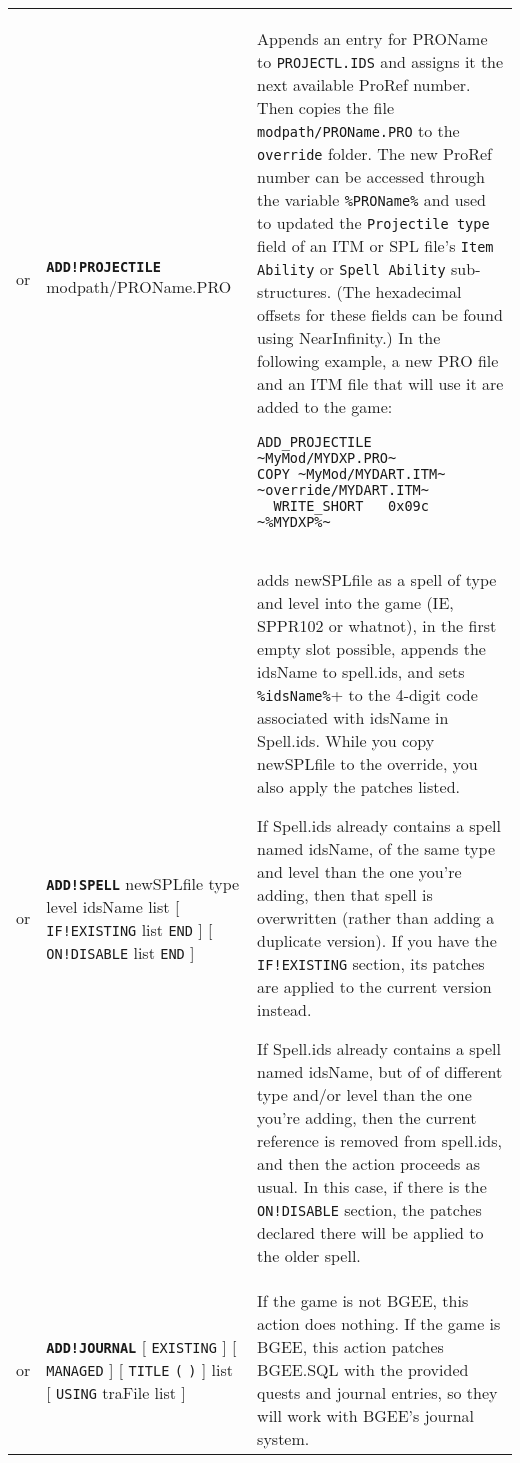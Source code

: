 \documentclass{article}
\def\ttref#1{\ahrefloc{#1}{\tt #1}}
\def\DEFINE#1{{\tt \bf #1}\label{#1}\index{#1}}
\def\t#1{{\tt #1}}
\def\Slist{{\color{red} list }}
\def\Ob{{\color{red} [ }}
\def\Oe{{\color{red} ] }}
\begin{document}
\begin{tabular}{cp{10in}|p{10in}}
  or & \DEFINE{ADD!PROJECTILE} modpath/PROName.PRO &
    Appends an entry for PROName to \t{PROJECTL.IDS} and assigns it the next
    available ProRef number.  Then copies the file \t{modpath/PROName.PRO}
    to the \t{override} folder.  The new ProRef number can be accessed
    through the variable \t{\%PROName\%} and used to updated the
    \t{Projectile type} field of an ITM or SPL file's \t{Item Ability} or
    \t{Spell Ability} sub-structures.  (The hexadecimal offsets for these
    fields can be found using NearInfinity.) In the following example, a
    new PRO file and an ITM file that will use it are added to the game:
\begin{verbatim}
ADD_PROJECTILE      ~MyMod/MYDXP.PRO~
COPY ~MyMod/MYDART.ITM~ ~override/MYDART.ITM~
  WRITE_SHORT   0x09c ~%MYDXP%~
\end{verbatim}
    \\
  or & \DEFINE{ADD!SPELL} newSPLfile type level idsName \ttref{patch} \Slist
       \Ob \t{IF!EXISTING} \ttref{patch} \Slist \t{END} \Oe
		\Ob \t{ON!DISABLE} \ttref{patch} \Slist \t{END} \Oe	   &
    adds newSPLfile as a spell of type and level into the game (IE, SPPR102 or
    whatnot), in the first empty slot possible, appends the idsName to
    spell.ids, and sets \verb+%idsName%+
    to the 4-digit code associated with idsName in Spell.ids. While you copy
    newSPLfile to the override, you also apply the patches listed.



	If Spell.ids already contains a spell named idsName, of the same type and
	level than the one you're adding, then that spell is overwritten (rather
	than adding a duplicate version). If you have the \verb+IF!EXISTING+
	section, its patches are applied to the current version instead.



	If Spell.ids already contains a spell named idsName, but of of different
	type and/or level than the one you're adding, then the current reference
	is removed from spell.ids, and then the action proceeds as usual. In this
	case, if there is the \verb+ON!DISABLE+ section, the patches declared
	there will be applied to the older spell.
	\\

  or & \DEFINE{ADD!JOURNAL} \Ob \t{EXISTING} \Oe \Ob \t{MANAGED} \Oe \Ob
       \t{TITLE} \t{(} \ttref{text} \t{)} \Oe \ttref{reference} \Slist \Ob
       \t{USING} traFile \Slist \Oe &
    If the game is not BGEE, this action does nothing.
    If the game is BGEE, this action patches BGEE.SQL with the provided
    quests and journal entries, so they will work with BGEE's journal system.


\end{tabular}
\end{document}
